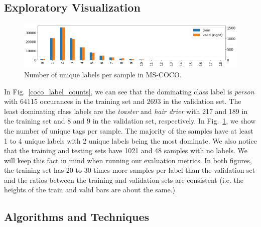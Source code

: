 \documentclass[12pt,journal,compsoc]{IEEEtran}
\begin{document}
\subsection{Exploratory Visualization}


\begin{figure}[!t]
\normalsize
\includegraphics[width=\linewidth]{mscoco_n_images_with_k_tags.png}
\caption{Number of unique labels per sample in MS-COCO.}
\label{coco_n_images_with_k_tags}
\vspace*{4pt}
\end{figure}

In Fig.~\ref{coco_label_counts}, we can see that the dominating class label is \textit{person} with 64115 occurances in the training set and 2693 in the validation set. The least dominating class labels are the \textit{toaster} and \textit{hair drier} with 217 and 189 in the training set and 8 and 9 in the validation set, respectively.
In Fig.~\ref{coco_n_images_with_k_tags}, we show the number of unique tags per sample.  The majority of the samples have at least 1 to 4 unique labels with 2 unique labels being the most dominate.  We also notice that the training and testing sets have 1021 and 48 samples with no labels. We will keep this fact in mind when running our evaluation metrics.
In both figures, the training set has 20 to 30 times more samples per label than the validation set and the ratios between the training and validation sets are consistent (i.e. the heights of the train and valid bars are about the same.)

\subsection{Algorithms and Techniques}\label{sec:algo}
\end{document}
